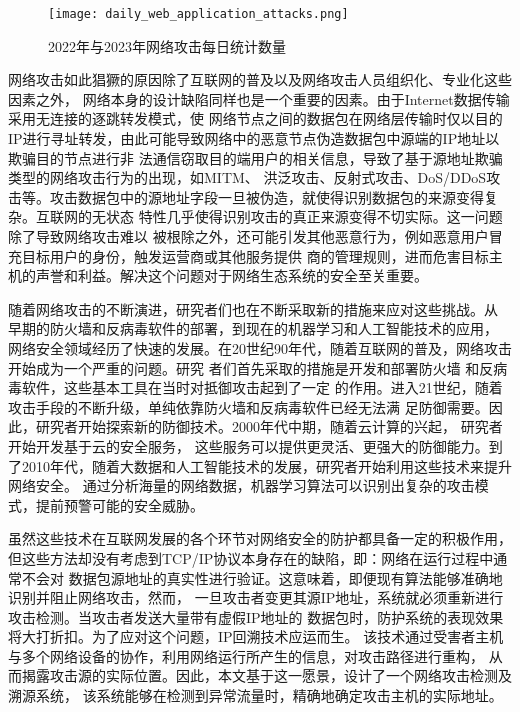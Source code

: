\begin{figure}[htbp]
  \centering
  \texttt{[image: daily\_web\_application\_attacks.png]}
  \caption{2022年与2023年网络攻击每日统计数量\cite{akamai}}
  \label{fig:daily_web_application_attacks}
\end{figure}

网络攻击如此猖獗的原因除了互联网的普及以及网络攻击人员组织化、专业化这些因素之外，
网络本身的设计缺陷同样也是一个重要的因素。由于Internet数据传输采用无连接的逐跳转发模式，使
网络节点之间的数据包在网络层传输时仅以目的IP进行寻址转发，由此可能导致网络中的恶意节点伪造数据包中源端的IP地址以欺骗目的节点进行非
法通信窃取目的端用户的相关信息，导致了基于源地址欺骗类型的网络攻击行为的出现，如MITM、
洪泛攻击、反射式攻击、DoS/DDoS攻击等\cite{zhen2022}。攻击数据包中的源地址字段一旦被伪造，就使得识别数据包的来源变得复杂。互联网的无状态
特性几乎使得识别攻击的真正来源变得不切实际\cite{singh2016}。这一问题除了导致网络攻击难以
被根除之外，还可能引发其他恶意行为，例如恶意用户冒充目标用户的身份，触发运营商或其他服务提供
商的管理规则，进而危害目标主机的声誉和利益。解决这个问题对于网络生态系统的安全至关重要。

随着网络攻击的不断演进，研究者们也在不断采取新的措施来应对这些挑战。从
早期的防火墙和反病毒软件的部署，到现在的机器学习和人工智能技术的应用，
网络安全领域经历了快速的发展。在20世纪90年代，随着互联网的普及，网络攻击开始成为一个严重的问题。研究
者们首先采取的措施是开发和部署防火墙\cite{Ioannidis2000DistributedFirewall}
和反病毒软件\cite{Cohen1983}，这些基本工具在当时对抵御攻击起到了一定
的作用。进入21世纪，随着攻击手段的不断升级，单纯依靠防火墙和反病毒软件已经无法满
足防御需要。因此，研究者开始探索新的防御技术。2000年代中期，随着云计算的兴起，
研究者开始开发基于云的安全服务\cite{Hashizume2013AnalysisSecurityCloud}，
这些服务可以提供更灵活、更强大的防御能力。到了2010年代，随着大数据和人工智能技术的发展，研究者开始利用这些技术来提升网络安全。
通过分析海量的网络数据，机器学习算法可以识别出复杂的攻击模式，提前预警可能的安全威胁。

虽然这些技术在互联网发展的各个环节对网络安全的防护都具备一定的积极作用，
但这些方法却没有考虑到TCP/IP协议本身存在的缺陷，即：网络在运行过程中通常不会对
数据包源地址的真实性进行验证。这意味着，即便现有算法能够准确地识别并阻止网络攻击，然而，
一旦攻击者变更其源IP地址，系统就必须重新进行攻击检测。当攻击者发送大量带有虚假IP地址的
数据包时，防护系统的表现效果将大打折扣。为了应对这个问题，IP回溯技术应运而生。
该技术通过受害者主机与多个网络设备的协作，利用网络运行所产生的信息，对攻击路径进行重构，
从而揭露攻击源的实际位置。因此，本文基于这一愿景，设计了一个网络攻击检测及溯源系统，
该系统能够在检测到异常流量时，精确地确定攻击主机的实际地址。

